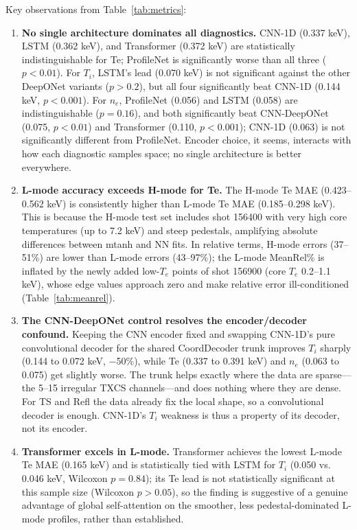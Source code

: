 \documentclass[a4paper,12pt]{article}
\begin{document}
Key observations from Table~\ref{tab:metrics}:

\begin{enumerate}
    \item \textbf{No single architecture dominates all diagnostics.} CNN-1D (0.337 keV), LSTM (0.362 keV), and Transformer (0.372 keV) are statistically indistinguishable for Te; ProfileNet is significantly worse than all three ($p<0.01$). For $T_i$, LSTM's lead (0.070 keV) is not significant against the other DeepONet variants ($p>0.2$), but all four significantly beat CNN-1D (0.144 keV, $p<0.001$). For $n_e$, ProfileNet (0.056) and LSTM (0.058) are indistinguishable ($p=0.16$), and both significantly beat CNN-DeepONet (0.075, $p<0.01$) and Transformer (0.110, $p<0.001$); CNN-1D (0.063) is not significantly different from ProfileNet. Encoder choice, it seems, interacts with how each diagnostic samples space; no single architecture is better everywhere.

    \item \textbf{L-mode accuracy exceeds H-mode for Te.} The H-mode Te MAE (0.423--0.562 keV) is consistently higher than L-mode Te MAE (0.185--0.298 keV). This is because the H-mode test set includes shot 156400 with very high core temperatures (up to 7.2 keV) and steep pedestals, amplifying absolute differences between mtanh and NN fits. In relative terms, H-mode errors (37--51\%) are lower than L-mode errors (43--97\%); the L-mode MeanRel\% is inflated by the newly added low-$T_e$ points of shot 156900 (core $T_e$ 0.2--1.1 keV), whose edge values approach zero and make relative error ill-conditioned (Table~\ref{tab:meanrel}).

    \item \textbf{The CNN-DeepONet control resolves the encoder/decoder confound.} Keeping the CNN encoder fixed and swapping CNN-1D's pure convolutional decoder for the shared CoordDecoder trunk improves $T_i$ sharply (0.144 to 0.072 keV, $-$50\%), while Te (0.337 to 0.391 keV) and $n_e$ (0.063 to 0.075) get slightly worse. The trunk helps exactly where the data are sparse---the 5--15 irregular TXCS channels---and does nothing where they are dense. For TS and Refl the data already fix the local shape, so a convolutional decoder is enough. CNN-1D's $T_i$ weakness is thus a property of its decoder, not its encoder.

    \item \textbf{Transformer excels in L-mode.} Transformer achieves the lowest L-mode Te MAE (0.165 keV) and is statistically tied with LSTM for $T_i$ (0.050 vs. 0.046 keV, Wilcoxon $p=0.84$); its Te lead is not statistically significant at this sample size (Wilcoxon $p>0.05$), so the finding is suggestive of a genuine advantage of global self-attention on the smoother, less pedestal-dominated L-mode profiles, rather than established.
\end{enumerate}
\end{document}
